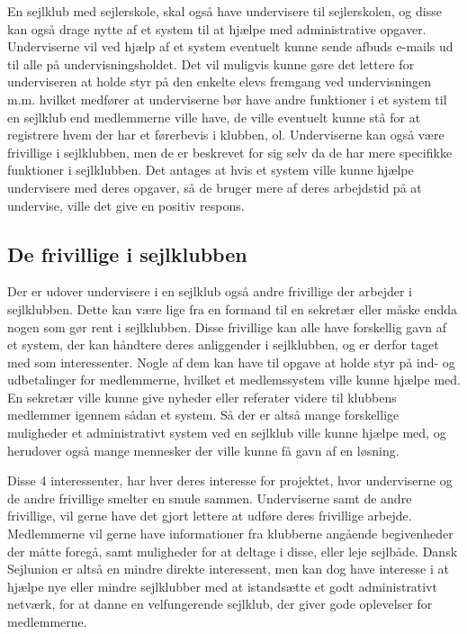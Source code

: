 En sejlklub med sejlerskole, skal også have undervisere til sejlerskolen, og disse kan også drage nytte af et system til
at hjælpe med administrative opgaver. Underviserne vil ved hjælp af et system eventuelt kunne sende afbuds e-mails ud til alle på
undervisningsholdet. Det vil muligvis kunne gøre det lettere for underviseren at holde styr på den enkelte elevs fremgang
ved undervisningen m.m. hvilket medfører at underviserne bør have andre funktioner i et system til en sejlklub end medlemmerne
ville have, de ville eventuelt kunne stå for at registrere hvem der har et førerbevis i klubben, ol. Underviserne kan også
være frivillige i sejlklubben, men de er beskrevet for sig selv da de har mere specifikke funktioner i sejlklubben. 
Det antages at hvis et system ville kunne hjælpe undervisere med deres opgaver, så de bruger mere af deres arbejdstid på
at undervise, ville det give en positiv respons.

\subsection{De frivillige i sejlklubben}

Der er udover undervisere i en sejlklub også andre frivillige der arbejder i sejlklubben. Dette kan være lige fra en
formand til en sekretær eller måske endda nogen som gør rent i sejlklubben. Disse frivillige kan alle have forskellig
gavn af et system, der kan håndtere deres anliggender i sejlklubben, og er derfor taget med som interessenter. Nogle af
dem kan have til opgave at holde styr på ind- og udbetalinger for medlemmerne, hvilket et medlemssystem ville kunne
hjælpe med. En sekretær ville kunne give nyheder eller referater videre til klubbens medlemmer igennem sådan et
system. Så der er altså mange forskellige muligheder et administrativt system ved en sejlklub ville kunne hjælpe med, og
herudover også mange mennesker der ville kunne få gavn af en løsning.


Disse 4 interessenter, har hver deres interesse for projektet, hvor underviserne og de andre frivillige smelter en smule
sammen. Underviserne samt de andre frivillige, vil gerne have det gjort lettere at udføre deres frivillige arbejde.
Medlemmerne vil gerne have informationer fra klubberne angående begivenheder der
måtte foregå, samt muligheder for at deltage i disse, eller leje sejlbåde.
Dansk Sejlunion er altså en mindre direkte interessent, men kan dog have interesse i at hjælpe nye eller mindre
sejlklubber med at istandsætte et godt administrativt netværk, for at danne en velfungerende sejlklub, 
der giver gode oplevelser for medlemmerne.

